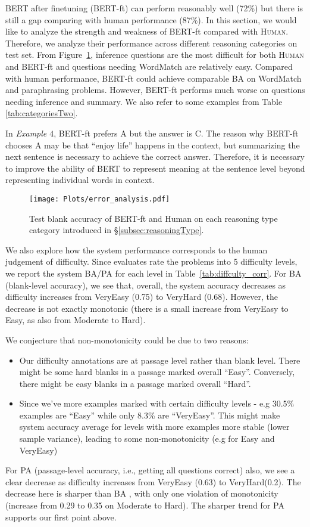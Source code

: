 \documentclass[11pt,a4paper]{article}
\begin{document}
BERT after finetuning (BERT-ft) can perform reasonably well (72\%) but there is still a gap comparing with human performance (87\%). In this section, we would like to analyze the strength and weakness of BERT-ft compared with \textsc{Human}. Therefore,
we analyze their performance across different reasoning categories on test set. From Figure~\ref{fig:error}, inference questions are the most difficult for both \textsc{Human} and BERT-ft and questions needing WordMatch are relatively easy.
Compared with human performance, BERT-ft could achieve comparable BA on WordMatch and paraphrasing problems. However, BERT-ft performs much worse on questions needing inference and summary. 
We also refer to some examples from Table \ref{tab:categoriesTwo}. 

In \emph{Example $4$}, BERT-ft prefers A but the answer is C. The reason why BERT-ft chooses A may be that ``enjoy life'' happens in the context, but summarizing the next sentence is necessary to achieve the correct answer. Therefore, it is necessary to improve the ability of BERT to represent meaning at the sentence level beyond representing individual words in context.  
\begin{figure}
    \centering
    \texttt{[image: Plots/error\_analysis.pdf]}
    \caption{Test blank accuracy of BERT-ft and Human on each reasoning type category introduced in \S \ref{subsec:reasoningType}.}
    \label{fig:error}
\end{figure}

We also explore how the system performance corresponds to the human judgement of difficulty. Since evaluates rate the problems into 5 difficulty levels, we report the system BA/PA for each level in Table~\ref{tab:diffculty_corr}. For BA (blank-level accuracy), we see that, overall, the system accuracy decreases as difficulty increases from VeryEasy (0.75) to VeryHard (0.68). However, the decrease is not exactly monotonic (there is a small increase from VeryEasy to Easy, as also from Moderate to Hard). 

We conjecture that non-monotonicity could be due to two reasons:
\begin{itemize}
    \item Our difficulty annotations are at passage level rather than blank level. There might be some hard blanks in a passage marked overall “Easy”. Conversely, there might be easy blanks in a passage marked overall “Hard”. 
    \item Since we’ve more examples marked with certain difficulty levels - e.g 30.5\% examples are “Easy” while only 8.3\% are “VeryEasy”. This might make system accuracy average for levels with more examples more stable (lower sample variance), leading to some non-monotonicity (e.g for Easy and VeryEasy)
\end{itemize}
For PA (passage-level accuracy, i.e., getting all questions correct) also, we see a clear decrease as difficulty increases from VeryEasy (0.63) to VeryHard(0.2). The decrease here is sharper than BA , with only one violation of monotonicity (increase from 0.29 to 0.35 on Moderate to Hard). The sharper trend for PA supports our first point above.
\end{document}
